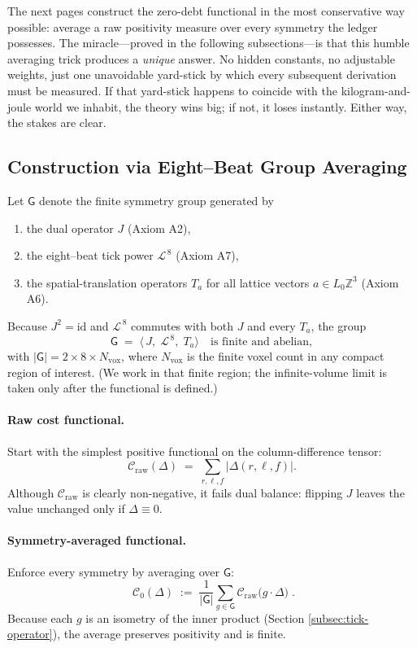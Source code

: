 \documentclass[11pt]{article}
\begin{document}
The next pages construct the zero-debt functional in the most conservative way possible: average a raw positivity measure over every symmetry the ledger possesses.  The miracle—proved in the following subsections—is that this humble averaging trick produces a \emph{unique} answer.  No hidden constants, no adjustable weights, just one unavoidable yard-stick by which every subsequent derivation must be measured.  If that yard-stick happens to coincide with the kilogram-and-joule world we inhabit, the theory wins big; if not, it loses instantly.  Either way, the stakes are clear.

\subsection{Construction via Eight–Beat Group Averaging}
\label{subsec:group-average}

Let \(\mathsf{G}\) denote the finite symmetry group generated by

\begin{enumerate}
  \item the dual operator \(J\) (Axiom A2),
  \item the eight–beat tick power \(\mathcal{L}^{\,8}\) (Axiom A7),
  \item the spatial-translation operators \(T_{a}\) for all lattice vectors \(a \in L_{0}\mathbb{Z}^{3}\) (Axiom A6).
\end{enumerate}

Because \(J^{2}=\mathrm{id}\) and \(\mathcal{L}^{\,8}\) commutes with both \(J\) and every \(T_{a}\), the group
\[
\mathsf{G}
\;=\;
\bigl\langle\,J,\;\mathcal{L}^{\,8},\;T_{a}\bigr\rangle
\quad
\text{is finite and abelian},
\]
with \(|\mathsf{G}| = 2 \times 8 \times N_{\text{vox}}\), where \(N_{\text{vox}}\) is the finite voxel count in any compact region of interest.  (We work in that finite region; the infinite-volume limit is taken only after the functional is defined.)

\paragraph{Raw cost functional.}
Start with the simplest positive functional on the column-difference tensor:
\[
\mathcal{C}_{\text{raw}}(\Delta)
\;=\;
\sum_{r,\ell,f} \bigl|\Delta(r,\ell,f)\bigr|.
\]
Although \(\mathcal{C}_{\text{raw}}\) is clearly non-negative, it fails dual balance: flipping \(J\) leaves the value unchanged only if \(\Delta\equiv0\).

\paragraph{Symmetry-averaged functional.}
Enforce every symmetry by averaging over \(\mathsf{G}\):
\[
\boxed{\;
\mathcal{C}_{0}(\Delta)
\;:=\;
\frac{1}{|\mathsf{G}|}
\sum_{g\in\mathsf{G}}
\mathcal{C}_{\text{raw}}\!\bigl(g\!\cdot\!\Delta\bigr)\;
}.
\]
Because each \(g\) is an isometry of the inner product (Section \ref{subsec:tick-operator}), the average preserves positivity and is finite.
\end{document}
